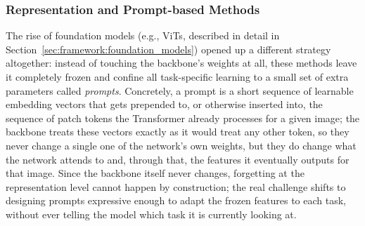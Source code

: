 \subsubsection{Representation and Prompt-based Methods}
The rise of foundation models (e.g., ViTs, described in detail in Section~\ref{sec:framework:foundation_models}) opened up a different strategy altogether: instead of touching the backbone's weights at all, these methods leave it completely frozen and confine all task-specific learning to a small set of extra parameters called \emph{prompts}. Concretely, a prompt is a short sequence of learnable embedding vectors that gets prepended to, or otherwise inserted into, the sequence of patch tokens the Transformer already processes for a given image; the backbone treats these vectors exactly as it would treat any other token, so they never change a single one of the network's own weights, but they do change what the network attends to and, through that, the features it eventually outputs for that image. Since the backbone itself never changes, forgetting at the representation level cannot happen by construction; the real challenge shifts to designing prompts expressive enough to adapt the frozen features to each task, without ever telling the model which task it is currently looking at.
